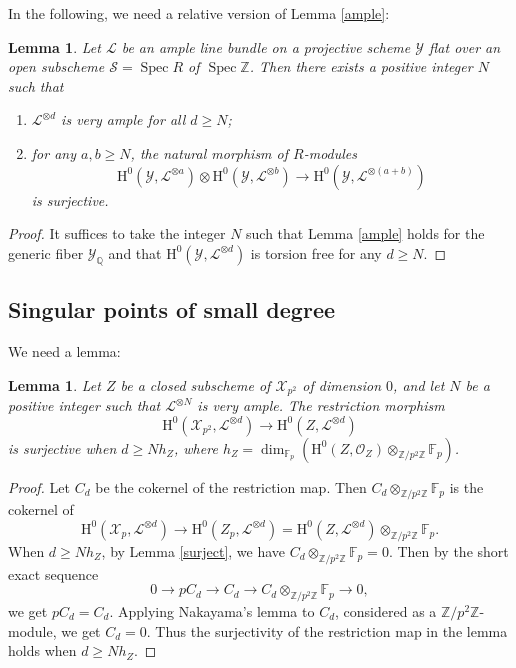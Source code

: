 \documentclass[JEP,XML,SOM,Unicode,published]{cedram}
\newenvironment{enumeratei}
{\bgroup\def\theenumi{\roman{enumi}}\def\theenumii{\arabic{enumii}}\begin{enumerate}}
{\end{enumerate}\egroup}
\theoremstyle{plain}
\newtheorem{lem}[thm]{Lemma}
\theoremstyle{definition}
\newcommand{\ho}{\mathrm{H}}
\newcommand{\X}{\mathcal{X}}
\newcommand{\li}{\mathcal{L}}
\newcommand{\Q}{\mathbb{Q}}
\newcommand{\Z}{\mathbb{Z}}
\newcommand{\F}{\mathbb{F}}
\DeclareMathOperator{\Spec}{Spec}
\begin{document}
In the following, we need a relative version of Lemma \ref{ample}:
\begin{lem}\label{relample}
Let $\li$ be an ample line bundle on a projective scheme $\mathcal{Y}$ flat over an open subscheme $\mathcal{S}=\Spec R$ of $\Spec \Z$.
Then there exists a positive integer $N$ such that
\begin{enumeratei}
\item $\li^{\otimes d}$ is very ample for all $d\geq N$;
\item for any $a, b\geq N$, the natural morphism of $R$-modules
\[
\ho^0(\mathcal{Y},\li^{\otimes a})\otimes \ho^0(\mathcal{Y},\li^{\otimes b})\to \ho^0(\mathcal{Y},\li^{\otimes (a+b)})
\]
is surjective.
\end{enumeratei}
\end{lem}
\begin{proof}
It suffices to take the integer $N$ such that Lemma \ref{ample} holds for the generic fiber $\mathcal{Y}_{\Q}$ and that $\ho^0(\mathcal{Y},\li^{\otimes d})$ is torsion free for any $d\geq N$.
\end{proof}

\subsection{Singular points of small degree}\label{step1}

We need a lemma:
\begin{lem}\label{sur}
Let $Z$ be a closed subscheme of $\X_{p^2}$ of dimension $0$, and let $N$ be a positive integer such that $\li^{\otimes N}$ is very ample.
The restriction morphism
\[
\ho^0(\X_{p^2}, \li^{\otimes d})\to \ho^0(Z, \li^{\otimes d})
\]
is surjective when $d\geq Nh_Z$, where $h_Z=\dim_{\F_p}\left(\ho^0(Z, \mathcal{O}_{Z})\otimes_{\Z/p^2\Z} \F_p\right)$.
\end{lem}
\begin{proof}
Let $C_d$ be the cokernel of the restriction map. Then $C_d\otimes_{\Z/p^2\Z}\F_{p}$ is the cokernel of
\[
\ho^0(\X_{p}, \li^{\otimes d})\to \ho^0(Z_p, \li^{\otimes d}) =\ho^0(Z, \li^{\otimes d}) \otimes_{\Z/p^2\Z} \F_p.
\]
When $d\geq Nh_Z$, by Lemma \ref{surject}, we have $C_d\otimes_{\Z/p^2\Z}\F_{p}=0$. Then by the short exact sequence
\[
0\to pC_d \to C_d \to C_d\otimes_{\Z/p^2\Z}\F_{p} \to 0,
\]
we get $pC_d=C_d$. Applying Nakayama's lemma to $C_d$, considered as a $\Z/p^2\Z$-module, we get $C_d=0$. Thus the surjectivity of the restriction map in the lemma holds when $d\geq Nh_Z$.
\end{proof}
\end{document}
